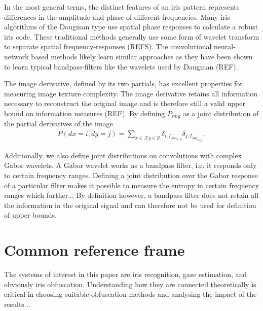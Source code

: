 In the most general terms, the distinct features of an iris pattern represents differences in the amplitude and phase of different frequencies. Many iris algorithms of the Daugman type use spatial phase responses to calculate a robust iris code. These traditional methods generally use some form of wavelet transform to separate spatial frequency-responses (REFS). The convolutional neural-network based methods likely learn similar approaches as they have been shown to learn typical bandpass-filters like the wavelets used by Daugman (REF). 

The image derivative, defined by its two partials, has excellent properties for measuring image texture complexity. The image derivative retains all information necessary to reconstruct the original image and is therefore still a valid upper bound on information measures (REF). By defining $P_{img}$ as a joint distribution of the partial derivatives of the image
\begin{align}
    P(dx=i, dy=j) = \sum_{x\in\mathcal{X}y\in\mathcal{Y}} \delta_{i, {I_{\Delta x}}_{x,y}} \delta_{j, {I_{\Delta y}}_{x,y}},
\end{align}

Additionally, we also define joint distributions on convolutions with complex Gabor wavelets. A Gabor wavelet works as a bandpass filter, i.e. it responds only to certain frequency ranges. Defining a joint distribution over the Gabor response of a particular filter makes it possible to measure the entropy in certain frequency ranges which further... By definition however, a bandpass filter does not retain all the information in the original signal and can therefore not be used for definition of upper bounds.





\section{Common reference frame}
The systems of interest in this paper are iris recognition, gaze estimation, and obviously iris obfuscation. Understanding how they are connected theoretically is critical in choosing suitable obfuscation methods and analysing the impact of the results...


